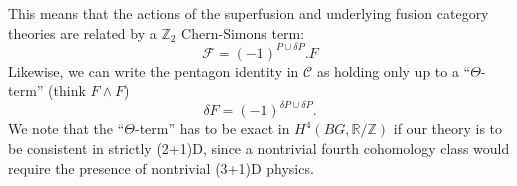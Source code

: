 \documentclass[12pt,a4paper]{article}
\newcommand{\tp}{\otimes}
\newcommand{\ra}{\rightarrow}
\newcommand{\unit}{\mathbf{1}}
\newcommand{\zz}{\mathbb{Z}}
\newcommand{\rr}{\mathbb{R}}
\newcommand{\mcg}{\mathcal{G}}
\newcommand{\zt}{\mathbb{Z}_2}
\newcommand\be            {\begin{equation}}
\newcommand\ee            {\end{equation}}
\newcommand{\mcf}{\mathcal{F}}
\newcommand{\mcc}{\mathcal{C}}
\newcommand{\wt}{\widetilde}
\newcommand{\vect}{\text{Vec}}
\newtheorem{prop}{Proposition}
\begin{document}
This means that the actions of the superfusion and underlying fusion category theories are related by a $\zt$ Chern-Simons term:
\be \mcf = (-1)^{P\cup\delta P}. F\ee
Likewise, we can write the pentagon identity in $\mcc$ as holding only up to a ``$\Theta$-term'' (think $F \wedge F$)
\be \delta F = (-1)^{\delta P \cup \delta P}.\ee
We note that the ``$\Theta$-term'' has to be exact in $H^4(BG,\rr/\zz)$ if our theory is to be consistent in strictly (2+1)D, since a nontrivial fourth cohomology class would require the presence of nontrivial (3+1)D physics. 

\end{document}

